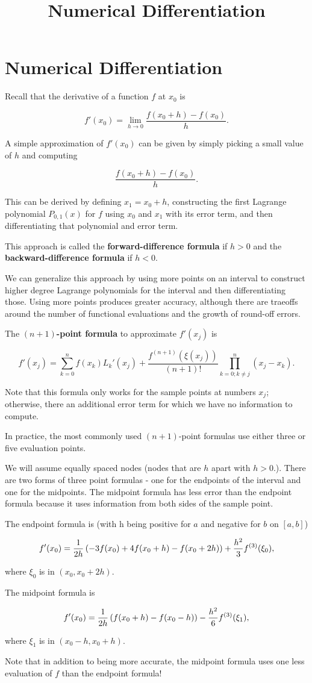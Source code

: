 \documentclass{article}
\title{Numerical Differentiation}
\begin{document}
\section{Numerical Differentiation}

Recall that the derivative of a function $f$ at $x_0$ is

\[ f'(x_0) = \lim_{h \to 0} \frac{f(x_0 + h) - f(x_0)}{h}. \]

A simple approximation of $f'(x_0)$ can be given by simply picking a small value of $h$ and computing

\[ \frac{f(x_0 + h) - f(x_0)}{h}. \]

This can be derived by defining $x_1 = x_0 + h$, constructing the first Lagrange polynomial $P_{0,1}(x)$ for $f$ using $x_0$ and $x_1$ with its error term, and then differentiating that polynomial and error term.

This approach is called the \textbf{forward-difference formula} if $h > 0$ and the \textbf{backward-difference formula} if $h < 0.$ 

We can generalize this approach by using more points on an interval to construct higher degree Lagrange polynomials for the interval and then differentiating those. Using more points produces greater accuracy, although there are traeoffs around the number of functional evaluations and the growth of round-off errors.

The \textbf{$(n+1)$-point formula} to approximate $f'(x_j)$ is

\[ f'(x_j) = \sum_{k=0}^n f(x_k){L_{k}}'(x_j) + \frac{f^{(n+1)}(\xi(x_j))}{(n+1)!} \prod_{k=0; k \neq j}^n (x_j - x_k). \]

Note that this formula only works for the sample points at numbers $x_j$; otherwise, there an additional error term for which we have no information to compute.

In practice, the most commonly used $(n+1)$-point formulas use either three or five evaluation points.

We will assume equally spaced nodes (nodes that are $h$ apart with $h > 0.$). There are two forms of three point formulas - one for the endpoints of the interval and one for the midpoints. The midpoint formula has less error than the endpoint formula because it uses information from both sides of the sample point.

The endpoint formula is (with h being positive for $a$ and negative for $b$ on $[a, b]$)

\[ f'(x_0) = \frac{1}{2h}\left(-3f(x_0) + 4f(x_0 + h) - f(x_0 + 2h)\right) + \frac{h^2}{3}f^{(3)}(\xi_0), \]

where $\xi_0$ is in $(x_0, x_0 + 2h).$

The midpoint formula is

\[ f'(x_0) = \frac{1}{2h} \left(f(x_0 + h) - f(x_0 -h)\right) - \frac{h^2}{6}f^{(3)}(\xi_1), \]

where $\xi_1$ is in $(x_0 - h, x_0 + h).$

Note that in addition to being more accurate, the midpoint formula uses one less evaluation of $f$ than the endpoint formula!
\end{document}
